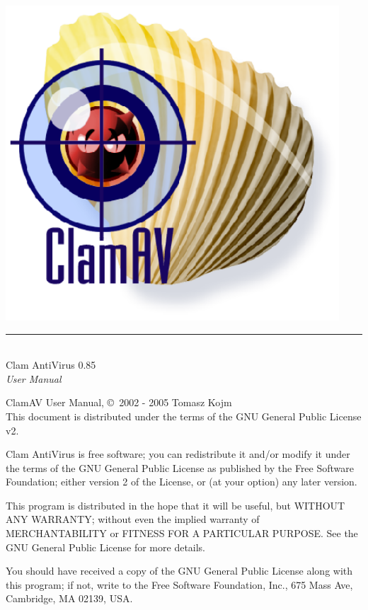 \documentclass[a4paper,titlepage,12pt]{article}
\date{}
\begin{document}
    \setcounter{page}{0}

    \pagestyle{empty}
    \includegraphics[width=353pt]{clam.eps}
    \vspace{3cm}
    \begin{flushright}
	\rule[-1ex]{8cm}{3pt}\\
	\huge Clam AntiVirus 0.85\\
	\huge \emph{User Manual}\\
    \end{flushright}

    \newpage
    \pagestyle{fancy}
    \tableofcontents
    \vspace{12.0cm}

    \noindent
    \begin{boxedminipage}[b]{\textwidth}
    ClamAV User Manual, \copyright \  2002 - 2005 Tomasz Kojm\\
    This document is distributed under the terms of the GNU General
    Public License v2.
    \end{boxedminipage}

    \vspace{1.0cm}

    \noindent
    \begin{boxedminipage}[b]{\textwidth}
    Clam AntiVirus is free software; you can redistribute it and/or modify
    it under the terms of the GNU General Public License as published by
    the Free Software Foundation; either version 2 of the License, or
    (at your option) any later version.

    This program is distributed in the hope that it will be useful,
    but WITHOUT ANY WARRANTY; without even the implied warranty of
    MERCHANTABILITY or FITNESS FOR A PARTICULAR PURPOSE.  See the
    GNU General Public License for more details.

    You should have received a copy of the GNU General Public License
    along with this program; if not, write to the Free Software
    Foundation, Inc., 675 Mass Ave, Cambridge, MA 02139, USA.
    \end{boxedminipage}
\end{document}
